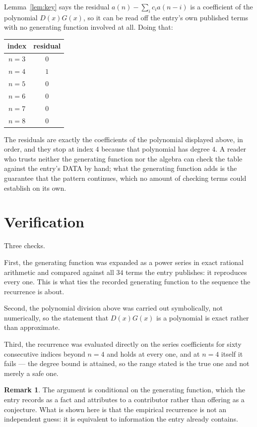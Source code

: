 \documentclass[11pt,a4paper]{article}
\theoremstyle{plain}
\theoremstyle{definition}
\newtheorem{remark}[theorem]{Remark}
\begin{document}
Lemma~\ref{lem:key} says the residual $a(n)-\sum_ic_ia(n-i)$ is a coefficient of the
polynomial $D(x)G(x)$, so it can be read off the entry's own published terms with no
generating function involved at all. Doing that:
\begin{center}
\begin{tabular}{cc}
index & residual \\ \hline
$n=3$ & $0$ \\
$n=4$ & $1$ \\
$n=5$ & $0$ \\
$n=6$ & $0$ \\
$n=7$ & $0$ \\
$n=8$ & $0$
\end{tabular}
\end{center}
The residuals are exactly the coefficients of the polynomial displayed above, in order, and
they stop at index $4$ because that polynomial has degree $4$. A reader who trusts
neither the generating function nor the algebra can check the table against the entry's DATA
by hand; what the generating function adds is the guarantee that the pattern continues, which
no amount of checking terms could establish on its own.

\section{Verification}

Three checks.

First, the generating function was expanded as a power series in exact rational arithmetic and
compared against all $34$ terms the entry publishes: it reproduces every one. This is
what ties the recorded generating function to the sequence the recurrence is about.

Second, the polynomial division above was carried out symbolically, not numerically, so the
statement that $D(x)G(x)$ is a polynomial is exact rather than approximate.

Third, the recurrence was evaluated directly on the series coefficients for sixty consecutive
indices beyond $n=4$ and holds at every one, and at $n=4$ itself it fails --- the
degree bound is attained, so the range stated is the true one and not merely a safe one.

\begin{remark}
The argument is conditional on the generating function, which the entry records as a fact and
attributes to a contributor rather than offering as a conjecture. What is shown here is that
the empirical recurrence is not an independent guess: it is equivalent to information the
entry already contains.
\end{remark}
\end{document}
